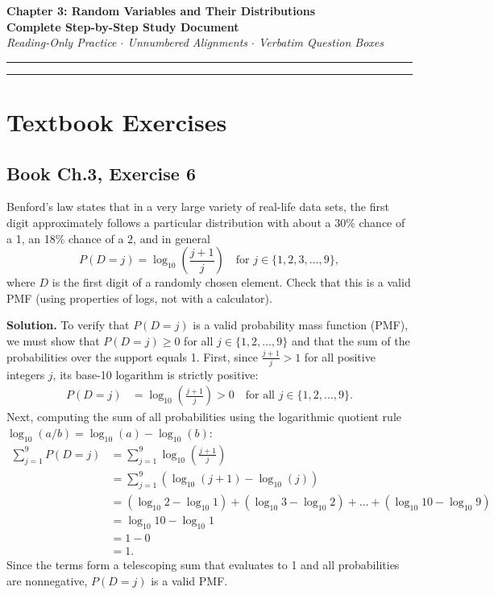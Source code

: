 \documentclass[11pt,a4paper]{article}
\begin{document}
\begin{center}
    {\LARGE \textbf{Chapter 3: Random Variables and Their Distributions}}\\[8pt]
    {\Large \textbf{Complete Step-by-Step Study Document}}\\[6pt]
    {\small \textit{Reading-Only Practice $\cdot$ Unnumbered Alignments $\cdot$ Verbatim Question Boxes}}
\end{center}

\vspace{5pt}
\hrule
\vspace{10pt}

\tableofcontents

\vspace{15pt}
\hrule
\vspace{15pt}

\section{Textbook Exercises}

\subsection{Book Ch.3, Exercise 6}
\begin{tcolorbox}[title={Book Ch.3, Exercise 6}]
Benford's law states that in a very large variety of real-life data sets, the first digit approximately follows a particular distribution with about a 30\% chance of a 1, an 18\% chance of a 2, and in general
\[
P(D=j) = \log_{10}\left(\frac{j+1}{j}\right) \quad \text{for } j \in \{1, 2, 3, \dots, 9\},
\]
where $D$ is the first digit of a randomly chosen element. Check that this is a valid PMF (using properties of logs, not with a calculator).
\end{tcolorbox}

\noindent \textbf{Solution.} To verify that $P(D=j)$ is a valid probability mass function (PMF), we must show that $P(D=j) \ge 0$ for all $j \in \{1, 2, \dots, 9\}$ and that the sum of the probabilities over the support equals 1. First, since $\frac{j+1}{j} > 1$ for all positive integers $j$, its base-10 logarithm is strictly positive:
\begin{align*}
P(D=j) &= \log_{10}\left(\frac{j+1}{j}\right) > 0 \quad \text{for all } j \in \{1, 2, \dots, 9\}.
\end{align*}
Next, computing the sum of all probabilities using the logarithmic quotient rule $\log_{10}(a/b) = \log_{10}(a) - \log_{10}(b)$:
\begin{align*}
\sum_{j=1}^{9} P(D=j) &= \sum_{j=1}^{9} \log_{10}\left(\frac{j+1}{j}\right) \\
&= \sum_{j=1}^{9} \left( \log_{10}(j+1) - \log_{10}(j) \right) \\
&= (\log_{10} 2 - \log_{10} 1) + (\log_{10} 3 - \log_{10} 2) + \dots + (\log_{10} 10 - \log_{10} 9) \\
&= \log_{10} 10 - \log_{10} 1 \\
&= 1 - 0 \\
&= 1.
\end{align*}
Since the terms form a telescoping sum that evaluates to 1 and all probabilities are nonnegative, $P(D=j)$ is a valid PMF.
\end{document}
